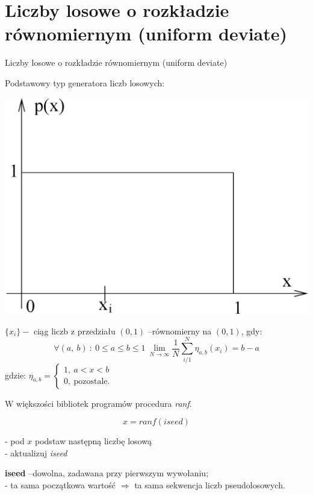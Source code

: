 \section{Liczby losowe o rozkładzie równomiernym (uniform deviate)}
\begin{frame}{Liczby losowe o rozkładzie równomiernym (uniform deviate)}


	Podstawowy typ generatora liczb losowych:
	\begin{center}
	\includegraphics[scale=0.15]{img/14/14_2_img}
	\end{center}
    \end{frame}

    \begin{frame}
    \begin{exampleblock}{}
	$\{x_{i}\}-$ ciąg liczb z przedziału $(0,1)$ --równomierny na $(0,1)$, gdy:
	$$
	\forall(a,\ b)\ :\ 0\leq a\leq b\leq 1\ \lim_{N\rightarrow\infty}\frac{1}{N}\sum_{i/1}^{N}\eta_{a,b}		(x_{i})=b-a
	$$
	gdzie: $\eta_{a,b}=\left\{\begin{array}{l}
	1,\ a<x<b\\
	0,\ \mathrm{p}\mathrm{o}\mathrm{z}\mathrm{o}\mathrm{s}\mathrm{t}\mathrm{a}\mathrm{l}\mathrm{e}.
	\end{array}\right.$
	\end{exampleblock}
	W większości bibliotek programów procedura \textit{ranf}.

            \[
            	x = ranf(iseed)
            \]

	- pod $x$ podstaw następną liczbę losową \\
    - aktualizuj \textit{iseed}

	\textbf{iseed} --dowolna, zadawana przy pierwszym wywołaniu; \\
	- ta sama początkowa wartość $\Rightarrow$ ta sama sekwencja liczb pseudolosowych.
	\end{frame}
